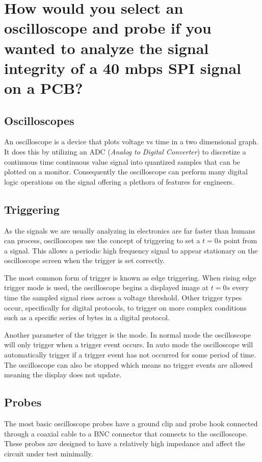 \documentclass[main.tex]{subfiles}
\begin{document}
\section{How would you select an oscilloscope and probe if you wanted to analyze the signal integrity of a 40 mbps SPI signal on a PCB?}

\subsection{Oscilloscopes}
An oscilloscope is a device that plots voltage vs time in a two dimensional graph. It does this by utilizing an ADC (\textit{Analog to Digital Converter}) to discretize a continuous time continuous value signal into quantized samples that can be plotted on a monitor. Consequently the oscilloscope can perform many digital logic operations on the signal offering a plethora of features for engineers. 

\subsection{Triggering}
As the signals we are usually analyzing in electronics are far faster than humans can process, oscilloscopes use the concept of triggering to set a $t=0s$ point from a signal. This allows a periodic high frequency signal to appear stationary on the oscilloscope screen when the trigger is set correctly. 

The most common form of trigger is known as edge triggering. When rising edge trigger mode is used, the oscilloscope begins a displayed image at $t=0s$ every time the sampled signal rises across a voltage threshold. Other trigger types occur, specifically for digital protocols, to trigger on more complex conditions such as a specific series of bytes in a digital protocol. 

Another parameter of the trigger is the mode. In normal mode the oscilloscope will only trigger when a trigger event occurs. In auto mode the oscilloscope will automatically trigger if a trigger event has not occurred for some period of time. The oscilloscope can also be stopped which means no trigger events are allowed meaning the display does not update.  

\subsection{Probes}
The most basic oscilloscope probes have a ground clip and probe hook connected through a coaxial cable to a BNC connector that connects to the oscilloscope. These probes are designed to have a relatively high impedance and affect the circuit under test minimally. 
\end{document}
